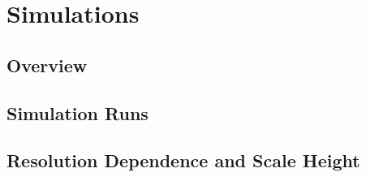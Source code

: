 \chapter{Simulations}\label{sec:simulations}

\section{Overview}


\section{Simulation Runs}\label{sec:sims}

\clearpage


\section{Resolution Dependence and Scale Height}

